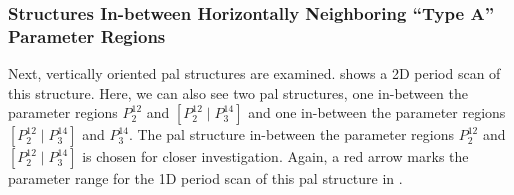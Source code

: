 \subsubsection{ Structures In-between Horizontally Neighboring ``Type A'' Parameter Regions}

Next, vertically oriented \gls{pal} structures are examined.
 shows a 2D period scan of this structure.
Here, we can also see two \gls{pal} structures, one in-between the parameter regions $P^{12}_2$ and $\left[P^{12}_2 \mid P^{14}_3\right]$ and one in-between the parameter regions $\left[P^{12}_2 \mid P^{14}_3\right]$ and $P^{14}_3$.
The \gls{pal} structure in-between the parameter regions $P^{12}_2$ and $\left[P^{12}_2 \mid P^{14}_3\right]$ is chosen for closer investigation.
Again, a red arrow marks the parameter range for the 1D period scan of this \gls{pal} structure in .

